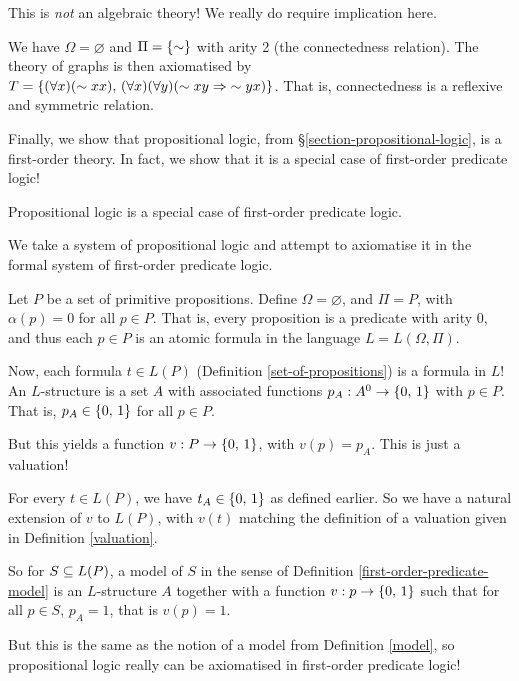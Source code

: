 \documentclass{article}
\begin{document}
\begin{note}
	This is \textit{not} an algebraic theory! We really do require implication here.
\end{note}

\begin{example}[Graphs]
    We have $\Omega = \varnothing$ and $\Pi = \left\lbrace \sim \right\rbrace$ with arity 2 (the connectedness relation). The theory of graphs is then axiomatised by $T = \left\lbrace (\forall x)(\sim xx), \, (\forall x)(\forall y)(\sim xy \Rightarrow \;\sim yx) \right\rbrace$. That is, connectedness is a reflexive and symmetric relation.
\end{example}

Finally, we show that propositional logic, from \S\ref{section-propositional-logic}, is a first-order theory. In fact, we show that it is a special case of first-order predicate logic!

\begin{proposition}
    Propositional logic is a special case of first-order predicate logic.
\end{proposition}

\begin{prf}
	We take a system of propositional logic and attempt to axiomatise it in the formal system of first-order predicate logic.
	
    Let $P$ be a set of primitive propositions. Define $\Omega = \varnothing$, and $\Pi = P$, with $\alpha(p) = 0$ for all $p \in P$. That is, every proposition is a predicate with arity 0, and thus each $p \in P$ is an atomic formula in the language $L = L(\Omega, \Pi)$.
    
    Now, each formula $t \in L(P)$ (Definition \ref{set-of-propositions}) is a formula in $L$! An $L$-structure is a set $A$ with associated functions $p_A : A^0 \to \left\lbrace 0, \, 1 \right\rbrace$ with $p \in P$. That is, $p_A \in \left\lbrace 0, \, 1 \right\rbrace$ for all $p \in P$.
    
    But this yields a function $v : P \to \left\lbrace 0, \, 1 \right\rbrace$, with $v(p) = p_A$. This is just a valuation!
    
    For every $t \in L(P)$, we have $t_A \in \left\lbrace 0, \, 1 \right\rbrace$ as defined earlier. So we have a natural extension of $v$ to $L(P)$, with $v(t)$ matching the definition of a valuation given in Definition \ref{valuation}.
    
    So for $S \subseteq L(P)$, a model of $S$ in the sense of Definition \ref{first-order-predicate-model} is an $L$-structure $A$ together with a function $v : p \to \left\lbrace 0, \, 1 \right\rbrace$ such that for all $p \in S$, $p_A = 1$, that is $v(p) = 1$.
    
    But this is the same as the notion of a model from Definition \ref{model}, so propositional logic really can be axiomatised in first-order predicate logic!
\end{prf}
\end{document}
